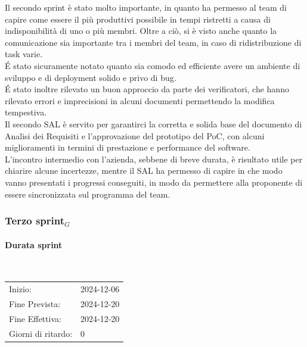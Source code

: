 \documentclass[10pt]{article}
\begin{document}
{{{    Il secondo sprint è stato molto importante, in quanto ha permesso al team di capire come essere il più produttivi possibile in tempi ristretti a causa di indisponibilità di uno o più membri. Oltre a ciò, si è visto anche quanto la comunicazione sia importante tra i membri del team, in caso di ridistribuzione di task varie.\\ 
    \'E stato sicuramente notato quanto sia comodo ed efficiente avere un ambiente di sviluppo e di deployment solido e privo di bug.\\ 
    \'E stato inoltre rilevato un buon approccio da parte dei verificatori, che hanno rilevato errori e imprecisioni in alcuni documenti permettendo la modifica tempestiva.\\ 
    Il secondo SAL è servito per garantirci la corretta e solida base del documento di Analisi dei Requisiti e l'approvazione del prototipo del PoC, con alcuni miglioramenti in termini di prestazione e performance del software.\\ 
    L'incontro intermedio con l'azienda, sebbene di breve durata, è risultato utile per chiarire alcune incertezze, mentre il SAL ha permesso di capire in che modo vanno presentati i progressi conseguiti, in modo da permettere alla proponente di essere sincronizzata sul programma del team.
    

\newpage
\subsubsection{Terzo sprint$_G$}
\label{terzo-sprint$_G$}
    
    \paragraph{Durata sprint}\mbox{}\\
    \vspace{-1.5em}
    \begin{table}[h] 
    \renewcommand{\arraystretch}{1.2}  
    \begin{tabular}{ l l }
        Inizio: & 2024-12-06 \\
        Fine Prevista: & 2024-12-20 \\
        Fine Effettiva: & 2024-12-20 \\
        Giorni di ritardo: & 0 \\
    \end{tabular}
    \end{table}
    \vspace{-2em}
    {\renewcommand{\arraystretch}{1.5}%
    
}}}}
\end{document}
